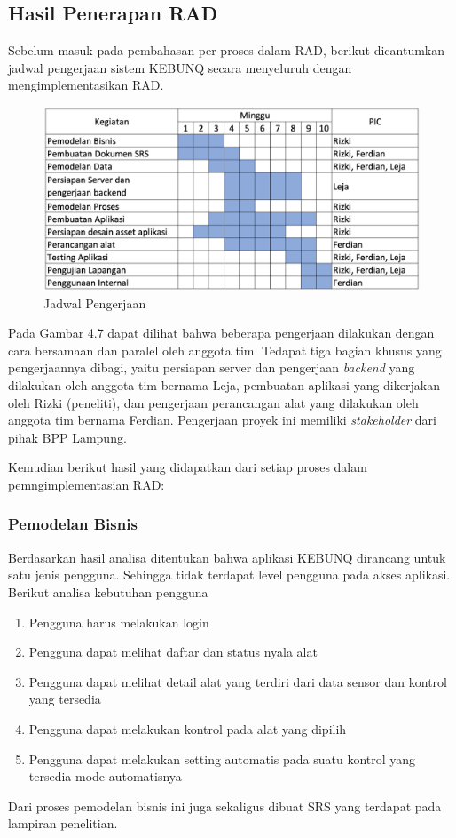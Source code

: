 \begin{flushleft}
\begin{justify}
        \subsection{Hasil Penerapan RAD}
        Sebelum masuk pada pembahasan per proses dalam RAD, berikut dicantumkan jadwal pengerjaan 
        sistem KEBUNQ secara menyeluruh dengan mengimplementasikan RAD.
        \begin{figure}[ht]
            \centering
            \includegraphics[width=14cm]{images/bab 4/gantt.png}
            \caption{Jadwal Pengerjaan}
        \end{figure}

        \noindent Pada Gambar 4.7 dapat dilihat bahwa beberapa pengerjaan dilakukan dengan cara bersamaan 
        dan paralel oleh anggota tim. Tedapat tiga bagian khusus yang pengerjaannya dibagi, yaitu persiapan server
        dan pengerjaan \emph{backend} yang dilakukan oleh anggota tim bernama Leja, pembuatan aplikasi yang dikerjakan oleh Rizki (peneliti), dan pengerjaan
        perancangan alat yang dilakukan oleh anggota tim bernama Ferdian. Pengerjaan proyek ini memiliki \emph{stakeholder} dari pihak BPP Lampung. 
        
        Kemudian berikut hasil yang didapatkan dari setiap proses dalam pemngimplementasian RAD:\\
        \subsubsection{Pemodelan Bisnis}
        Berdasarkan hasil analisa ditentukan bahwa aplikasi KEBUNQ dirancang untuk satu jenis pengguna. Sehingga tidak terdapat level pengguna pada akses aplikasi.
        Berikut analisa kebutuhan pengguna
        \begin{enumerate}
            \item Pengguna harus melakukan login
            \item Pengguna dapat melihat daftar dan status nyala alat
            \item Pengguna dapat melihat detail alat yang terdiri dari data sensor dan kontrol yang tersedia
            \item Pengguna dapat melakukan kontrol pada alat yang dipilih
            \item Pengguna dapat melakukan setting automatis pada suatu kontrol yang tersedia mode automatisnya
        \end{enumerate}
       Dari proses pemodelan bisnis ini juga sekaligus dibuat SRS yang terdapat pada lampiran penelitian.\\

\end{justify}
\end{flushleft}

